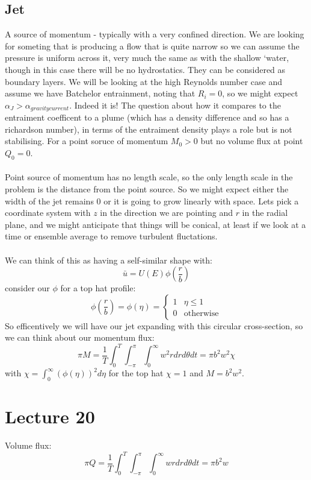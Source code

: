 \documentclass{article}
\begin{document}
\subsection{Jet}
A source of momentum - typically with a very confined direction. We are looking for someting that is producing a flow that is quite narrow so we can assume the pressure is uniform across it, very much the same as with the shallow `water, though in this case there will be no hydrostatics. They can be considered as boundary layers. We will be looking at the high Reynolds number case and assume we have Batchelor entrainment, noting that $R_i =  0$, so we might expect $\alpha_J > \alpha_{gravity current}$. Indeed it is! The question about how it compares to the entraiment coefficent to a plume (which has a density difference and so has a richardson number), in terms of the entraiment density plays a role but is not stabilising. For a point soruce of momentum $M_0 > 0$ but no volume flux at point $Q_0 = 0$.\\\\
Point source of momentum has no length scale, so the only length scale in the problem is the distance from the point source. So we might expect either the width of the jet remains $0$ or it is going to grow linearly with space. Lets pick a coordinate system with $z$ in the direction we are pointing and $r$ in the radial plane, and we might anticipate that things will be conical, at least if we look at a time or ensemble average to remove turbulent fluctations.\\\\
We can think of this as having a self-similar shape with:
$$
 \bar u = U ( E) \phi( \frac{r}{b})
$$
consider our $\phi$ for a top hat profile:
$$
 \phi(\frac{r}{b}) = \phi( \eta) = \begin{cases} 1 & \eta \leq 1\\ 0 & \text{otherwise} \end{cases}
$$
So efficentively we will have our jet expanding with this circular cross-section, so we can think about our momentum flux:
$$
 \pi M = \frac{1}{T} \int^{T}_0 \int_{-\pi}^{\pi} \int_0^{\infty} w^2 r dr d\theta d t = \pi b^2 w^2 \chi
$$
with $\chi = \int_0^{\infty} (\phi(\eta))^2 d\eta$ for the top hat $\chi =1$ and $M = b^2 w^2$.\section{Lecture 20}
Volume flux:
$$
 \pi Q = \frac{1}{T} \int_0^T \int^{\pi}_{-\pi} \int^{\infty}_0 w r dr d\theta dt = \pi b^2 w
$$
\end{document}
